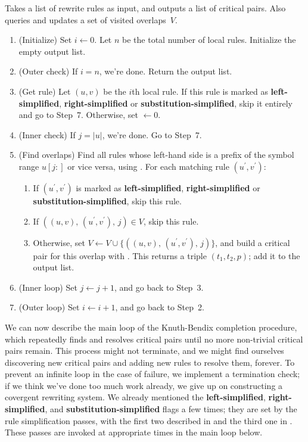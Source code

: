 \documentclass[../generics]{subfiles}
\begin{document}
\begin{algorithm}\label{find overlapping rule algo}
Takes a list of rewrite rules as input, and outputs a list of critical pairs. Also queries and updates a set of visited overlaps~$V$.
\begin{enumerate}
\item (Initialize) Set $i \leftarrow 0$. Let $n$ be the total number of local rules. Initialize the empty output list.
\item (Outer check) If $i=n$, we're done. Return the output list.
\item (Get rule) Let $(u,v)$ be the $i$th local rule. If this rule is marked as \textbf{left-simplified}, \textbf{right-simplified} or \textbf{substitution-simplified}, skip it entirely and go to Step~7. Otherwise, set $ \leftarrow 0$.
\item (Inner check) If $j=|u|$, we're done. Go to Step~7.
\item (Find overlaps) Find all rules whose left-hand side is a prefix of the symbol range $u[j:]$ or vice versa, using . For each matching rule $(u^\prime, v^\prime)$:
\begin{enumerate}
\item If $(u^\prime, v^\prime)$ is marked as \textbf{left-simplified}, \textbf{right-simplified} or \textbf{substitution-simplified}, skip this rule.
\item If $((u, v),\,(u^\prime, v^\prime),\,j)\in V$, skip this rule.
\item Otherwise, set $V\leftarrow V \cup \{((u, v),\,(u^\prime, v^\prime),\,j)\}$, and build a critical pair for this overlap with . This returns a triple $(t_1, t_2, p)$; add it to the output list.
\end{enumerate}
\item (Inner loop) Set $j\leftarrow j+1$, and go back to Step~3.
\item (Outer loop) Set $i\leftarrow i+1$, and go back to Step~2.
\end{enumerate}
\end{algorithm}

We can now describe the main loop of the Knuth-Bendix completion procedure, which repeatedly finds and resolves critical pairs until no more non-trivial critical pairs remain. This process might not terminate, and we might find ourselves discovering new critical pairs and adding new rules to resolve them, forever. To prevent an infinite loop in the case of failure, we implement a termination check; if we think we've done too much work already, we give up on constructing a covergent rewriting system. We already mentioned the \textbf{left-simplified}, \textbf{right-simplified}, and \textbf{substitution-simplified} flags a few times; they are set by the rule simplification passes, with the first two described in  and the third one in . These passes are invoked at appropriate times in the main loop below.
\end{document}
